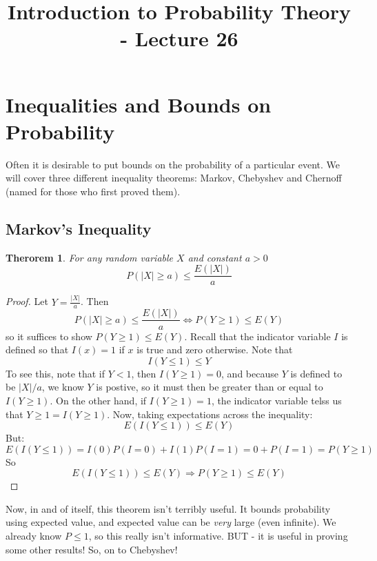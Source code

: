 \documentclass[12pt]{article} %
\date{}
\title{Introduction to Probability Theory - Lecture 26}
\newtheorem{thm}{Therorem}
\begin{document}
\maketitle

\section{Inequalities and Bounds on Probability}
Often it is desirable to put bounds on the probability of a particular event. We will cover three different inequality theorems: Markov, Chebyshev and Chernoff (named for those who first proved them). 

\subsection{Markov's Inequality}

\begin{thm}
For any random variable $X$ and constant $a>0$
$$P(|X|\geq a) \leq \frac{E(|X|)}{a}$$
\end{thm}
\begin{proof}
Let $Y=\frac{|X|}{a}$. Then
$$P(|X|\geq a) \leq \frac{E(|X|)}{a} \iff P(Y\geq 1) \leq E(Y)$$
so it suffices to show $P(Y\geq 1) \leq E(Y)$. Recall that the indicator variable $I$ is defined so that $I(x)=1$ if $x$ is true and zero otherwise. Note that
$$I(Y\leq 1)\leq Y$$
To see this, note that if $Y<1$, then $I(Y\geq 1) = 0$, and because $Y$ is defined to be $|X|/a$, we know $Y$ is postive, so it must then be greater than  or equal to $I(Y\geq 1)$. On the other hand, if $I(Y\geq 1) = 1$, the indicator variable telss us that $Y\geq 1 = I(Y\geq 1)$.
Now, taking expectations across the inequality:
$$E(I(Y\leq 1))\leq E(Y)$$ 
But:
$$E(I(Y\leq 1)) = I(0)P(I=0)+ I(1)P(I=1) = 0 + P(I=1) = P(Y\geq 1)$$
So 
$$E(I(Y\leq 1))\leq E(Y) \Rightarrow P(Y\geq 1) \leq E(Y)$$ 
\end{proof}
Now, in and of itself, this theorem isn't terribly useful. It bounds probability using expected value, and expected value can be \emph{very} large (even infinite). We already know $P\leq1$, so this really isn't informative. BUT - it is useful in proving some other results! So, on to Chebyshev!
\end{document}
